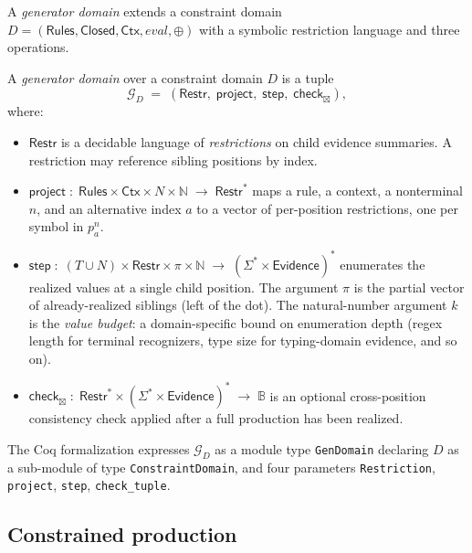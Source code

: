 A \emph{generator domain} extends a constraint domain
\(D = (\mathsf{Rules}, \mathsf{Closed}, \mathsf{Ctx}, \mathit{eval}, \oplus)\)
with a symbolic restriction language and three operations.

\begin{definition}
\label{def:gen-domain}
A \emph{generator domain} over a constraint domain \(D\) is a tuple
\[
  \mathcal{G}_D \;=\; (\mathsf{Restr},\; \mathsf{project},\; \mathsf{step},\; \mathsf{check}_\boxtimes),
\]
where:
\begin{itemize}[nosep]
  \item \(\mathsf{Restr}\) is a decidable language of \emph{restrictions} on
    child evidence summaries. A restriction may reference sibling
    positions by index.
  \item \(\mathsf{project} \;:\;
    \mathsf{Rules} \times \mathsf{Ctx} \times N \times \mathbb{N} \;\to\;
    \mathsf{Restr}^\ast\)
    maps a rule, a context, a nonterminal \(n\), and an alternative index \(a\)
    to a vector of per-position restrictions, one per symbol in \(p_a^n\).
  \item \(\mathsf{step} \;:\;
    (T \cup N) \times \mathsf{Restr} \times \pi \times \mathbb{N} \;\to\;
    (\Sigma^\ast \times \mathsf{Evidence})^\ast\)
    enumerates the realized values at a single child position. The argument
    \(\pi\) is the partial vector of already-realized siblings (left of the
    dot). The natural-number argument \(k\) is the \emph{value budget}: a
    domain-specific bound on enumeration depth (regex length for terminal
    recognizers, type size for typing-domain evidence, and so on).
  \item \(\mathsf{check}_\boxtimes \;:\;
    \mathsf{Restr}^\ast \times (\Sigma^\ast \times \mathsf{Evidence})^\ast \;\to\;
    \mathbb{B}\)
    is an optional cross-position consistency check applied after a full
    production has been realized.
\end{itemize}
\end{definition}

The Coq formalization expresses \(\mathcal{G}_D\) as a module type
\verb|GenDomain| declaring \(D\) as a sub-module of type
\verb|ConstraintDomain|, and four parameters \verb|Restriction|,
\verb|project|, \verb|step|, \verb|check_tuple|.

\subsection{Constrained production}
\label{sec:gen-cstr-prod}

